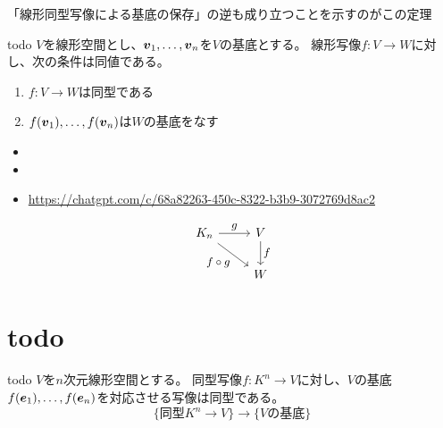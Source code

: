 \documentclass[../../../topic_linear-algebra]{subfiles}
\begin{document}
\begin{mindflow}
  「線形同型写像による基底の保存」の逆も成り立つことを示すのがこの定理
\end{mindflow}

\begin{theorem*}{todo}
  $V$を線形空間とし、$\vb*{v}_1, \ldots, \vb*{v}_n$を$V$の基底とする。
  線形写像$f \colon V \to W$に対し、次の条件は同値である。
  \begin{enumerate}[label=\romanlabel]
    \item $f\colon V \to W$は同型である
    \item $f(\vb*{v}_1), \ldots, f(\vb*{v}_n)$は$W$の基底をなす
  \end{enumerate}
\end{theorem*}

\begin{mindflow}
  \begin{itemize}
    \item {}
    \item {}
    \item \url{https://chatgpt.com/c/68a82263-450c-8322-b3b9-3072769d8ac2}
  \end{itemize}
\end{mindflow}

\begin{equation*}
  \begin{tikzcd}[every label/.append style = {font = \small}]
    K_n \arrow[r,"g"]\arrow[rd, "f \circ g"'] & V \arrow[d,"f"]\\
    & W
  \end{tikzcd}
\end{equation*}

\sectionline
\section{todo}

\begin{theorem*}{todo}
  $V$を$n$次元線形空間とする。
  同型写像$f\colon K^n \to V$に対し、$V$の基底$f(\vb*{e}_1), \ldots, f(\vb*{e}_n)$を対応させる写像は同型である。
  \begin{equation*}
    \{\text{同型} K^n \to V \} \to \{ V\text{の基底}\}
  \end{equation*}
\end{theorem*}
\end{document}
